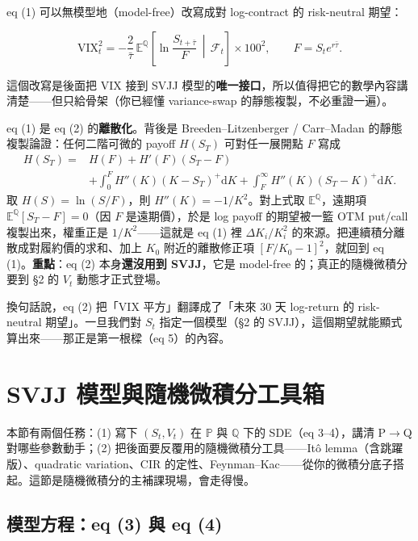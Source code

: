 \documentclass[12pt, a4paper]{article}
\theoremstyle{remark}
\newcommand{\E}{\mathbb{E}}
\newcommand{\Q}{\mathbb{Q}}
\newcommand{\Pp}{\mathbb{P}}
\newcommand{\dd}{\mathrm{d}}
\newcommand{\VIX}{\mathrm{VIX}}
\begin{document}
eq (1) 可以無模型地（model-free）改寫成對 log-contract 的 risk-neutral 期望：

\begin{equation}
  \VIX_t^2 = -\frac{2}{\bar\tau}\,\E^\Q\!\left[\ln\frac{S_{t+\bar\tau}}{F}\,\middle|\,\mathcal F_t\right]\times 100^2,
  \qquad F = S_t e^{r\bar\tau}.
  \tag{2}
\end{equation}

這個改寫是後面把 VIX 接到 SVJJ 模型的\textbf{唯一接口}，所以值得把它的數學內容講清楚——但只給骨架（你已經懂 variance-swap 的靜態複製，不必重證一遍）。

\begin{derivbox}[title={eq (1) $\to$ eq (2)：static replication 骨架（一段話版）}]
eq (1) 是 eq (2) 的\textbf{離散化}。背後是 Breeden--Litzenberger / Carr--Madan 的靜態複製論證：任何二階可微的 payoff $H(S_T)$ 可對任一展開點 $F$ 寫成
\[
  \begin{aligned}
  H(S_T) = {}& H(F) + H'(F)(S_T-F)\\
  &+ \int_0^F H''(K)(K-S_T)^+\dd K
  + \int_F^\infty H''(K)(S_T-K)^+\dd K.
  \end{aligned}
\]
取 $H(S)=\ln(S/F)$，則 $H''(K)=-1/K^2$。對上式取 $\E^\Q$，遠期項 $\E^\Q[S_T-F]=0$（因 $F$ 是遠期價），於是 log payoff 的期望被一籃 OTM put/call 複製出來，權重正是 $1/K^2$——這就是 eq (1) 裡 $\Delta K_i/K_i^2$ 的來源。把連續積分離散成對履約價的求和、加上 $K_0$ 附近的離散修正項 $[F/K_0-1]^2$，就回到 eq (1)。\textbf{重點}：eq (2) 本身\textbf{還沒用到 SVJJ}，它是 model-free 的；真正的隨機微積分要到 §2 的 $V_t$ 動態才正式登場。
\end{derivbox}

換句話說，eq (2) 把「VIX 平方」翻譯成了「未來 30 天 log-return 的 risk-neutral 期望」。一旦我們對 $S_t$ 指定一個模型（§2 的 SVJJ），這個期望就能顯式算出來——那正是第一根樑（eq 5）的內容。

\newpage

\section{SVJJ 模型與隨機微積分工具箱}

本節有兩個任務：(1) 寫下 $(S_t,V_t)$ 在 $\Pp$ 與 $\Q$ 下的 SDE（eq 3--4），講清 P$\to$Q 對哪些參數動手；(2) 把後面要反覆用的隨機微積分工具——Itô lemma（含跳躍版）、quadratic variation、CIR 的定性、Feynman--Kac——從你的微積分底子搭起。這節是隨機微積分的主補課現場，會走得慢。

\subsection{模型方程：eq (3) 與 eq (4)}
\end{document}
